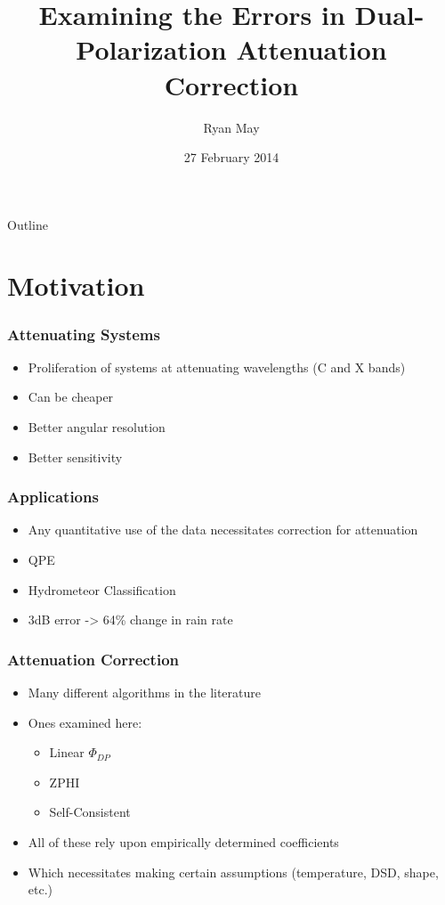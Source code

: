 \documentclass[red]{beamer}
\title{Examining the Errors in Dual-Polarization Attenuation Correction}
\author{Ryan May}
\date{27 February 2014}
\begin{document}
\begin{frame}
	\titlepage
\end{frame}

\begin{frame}{Outline}
    \tableofcontents
\end{frame}

\section{Motivation}
\begin{frame}[<+->]
	\frametitle{Attenuating Systems}
	\begin{itemize}
		\item Proliferation of systems at attenuating wavelengths (C and X bands)
		\item Can be cheaper
		\item Better angular resolution
		\item Better sensitivity
	\end{itemize}
\end{frame}

\begin{frame}
	\frametitle{Applications}
	\begin{itemize}[<+->]
		\item Any quantitative use of the data necessitates correction for attenuation
		\item QPE
		\item Hydrometeor Classification
		\item 3dB error -> 64\% change in rain rate
	\end{itemize}
\end{frame}

\begin{frame}
	\frametitle{Attenuation Correction}
	\begin{itemize}[<+->]
		\item Many different algorithms in the literature
		\item Ones examined here:
		\begin{itemize}
			\item Linear $\Phi_{DP}$
			\item ZPHI
			\item Self-Consistent
		\end{itemize}
		\item All of these rely upon empirically determined coefficients
		\item Which necessitates making certain assumptions (temperature,
		DSD, shape, etc.)
	\end{itemize}
\end{frame}
\end{document}
